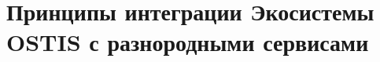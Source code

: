 \section{Принципы интеграции Экосистемы OSTIS с разнородными сервисами}
{\label{sec_integration_services}} 
